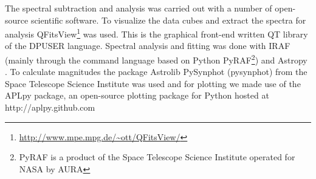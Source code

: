 The spectral subtraction and analysis was carried out with a number of open-source scientific software. To visualize the data cubes and extract the spectra for analysis QFitsView\footnote{\url{http://www.mpe.mpg.de/~ott/QFitsView/}} was used. This is the graphical front-end written QT library of the DPUSER language. Spectral analysis and fitting was done with IRAF \citep{1986SPIE..627..733T} (mainly through the command language based on Python PyRAF\footnote{PyRAF is a product of the Space Telescope Science Institute operated for NASA by AURA}) and Astropy \citep{astropy_collaboration_2013}. To calculate magnitudes the package Astrolib PySynphot (pysynphot) from the Space Telescope Science Institute was used \citep{pysynphot} and for plotting we made use of the APLpy package, an open-source plotting package for Python hosted at http://aplpy.github.com


